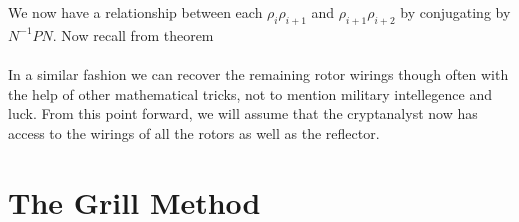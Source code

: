 We now have a relationship between each $\rho_i\rho_{i+1}$ and $\rho_{i+1}\rho_{i+2}$ by conjugating by $N^{-1}PN$. Now recall from theorem %
\\\\In a similar fashion we can recover the remaining rotor wirings though often with the help of other mathematical tricks, not to mention military intellegence and luck. From this point forward, we will assume that the cryptanalyst now has access to the wirings of all the rotors as well as the reflector.

\section{The Grill Method}

